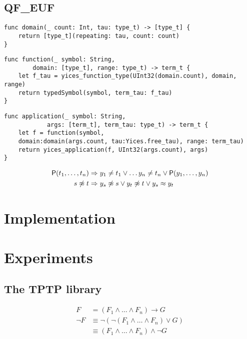\subsection{QF\_EUF}

\begin{lstlisting}[language=flea]
func domain(_ count: Int, tau: type_t) -> [type_t] {
	return [type_t](repeating: tau, count: count)
}
\end{lstlisting}

\begin{lstlisting}[language=flea]
func function(_ symbol: String, 
		domain: [type_t], range: type_t) -> term_t {
	let f_tau = yices_function_type(UInt32(domain.count), domain, range)
	return typedSymbol(symbol, term_tau: f_tau)
}
\end{lstlisting}

\begin{lstlisting}[language=flea]
func application(_ symbol: String, 
			args: [term_t], term_tau: type_t) -> term_t {
	let f = function(symbol, 
	domain:domain(args.count, tau:Yices.free_tau), range: term_tau)
	return yices_application(f, UInt32(args.count), args)
}
\end{lstlisting}


\begin{definition}
	
	\end{definition}

\begin{example}
	\begin{align*}
	{\mathsf P}(t_1,\ldots, t_n) &\Rightarrow y_1\neq t_1 \lor \ldots y_n\neq t_n \lor {\mathsf P}(y_1,\ldots,y_n) \\
	s \not\approx t &\Rightarrow y_s\not\approx s\lor y_t\not\approx t \lor y_s \approx y_t \\
	\end{align*}
	\end{example}


\section{Implementation}


\section{Experiments}

\subsection{The TPTP library}

\begin{align*}
F 
&=
(F_1 \land \ldots \land F_n) \rightarrow G
\\
\lnot F 
&\equiv
\lnot\left( \lnot(F_1 \land \ldots \land F_n) \lor G \right)
\\
&\equiv 
(F_1 \land \ldots \land F_n) \land \lnot G
\end{align*}

